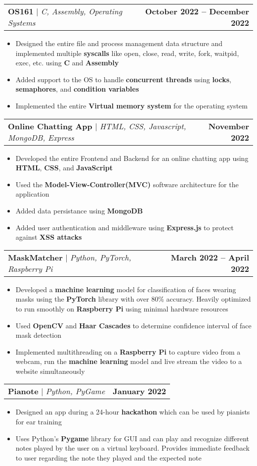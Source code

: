 \documentclass[letterpaper,11pt]{article}
\makeatletter
\newcommand{\resumeItem}[1]{
  \item\small{
    {#1 \vspace{-2pt}}
  }
}
\newcommand{\resumeProjectHeading}[2]{
    \item
    \begin{tabular*}{0.97\textwidth}{l@{\extracolsep{\fill}}r}
      \small#1 & \textbf{#2} \\
    \end{tabular*}\vspace{-5pt}
}
\newcommand{\resumeItemListStart}{\begin{itemize}}
\newcommand{\resumeItemListEnd}{\end{itemize}\vspace{-5pt}}
\makeatother
\begin{document}
          
      \resumeProjectHeading
          {\textbf{OS161} $|$ \emph{C, Assembly, Operating Systems}}{October 2022 -- December 2022}
          \resumeItemListStart
            \resumeItem{Designed the entire file and process management data structure and implemented multiple \textbf{syscalls} like open, close, read, write, fork, waitpid, exec, etc. using \textbf{C} and \textbf{Assembly}}
            \resumeItem{Added support to the OS to handle \textbf{concurrent threads} using \textbf{locks}, \textbf{semaphores}, and \textbf{condition variables}}
            \resumeItem{Implemented the entire \textbf{Virtual memory system} for the operating system}
          \resumeItemListEnd
    

        \resumeProjectHeading
            {\textbf{Online Chatting App} $|$ \emph{HTML, CSS, Javascript, MongoDB, Express}}{November 2022}
            \resumeItemListStart
                \resumeItem{Developed the entire Frontend and Backend for an online chatting app using \textbf{HTML}, \textbf{CSS}, and \textbf{JavaScript}}
                \resumeItem{Used the \textbf{Model-View-Controller(MVC)} software architecture for the application}
                \resumeItem{Added data persistance using \textbf{MongoDB}}
                \resumeItem{Added user authentication and middleware using \textbf{Express.js} to protect against \textbf{XSS attacks}}
            \resumeItemListEnd

        \resumeProjectHeading
            {\textbf{MaskMatcher} $|$ \emph{Python, PyTorch, Raspberry Pi}}{March 2022 -- April 2022}
            \resumeItemListStart
                \resumeItem{Developed a \textbf{machine learning} model for classification of faces wearing masks using the \textbf{PyTorch} library with over 80\% accuracy. Heavily optimized to run smoothly on \textbf{Raspberry Pi} using minimal hardware resources}
                \resumeItem{Used \textbf{OpenCV} and \textbf{Haar Cascades} to determine confidence interval of face mask detection}
                \resumeItem{Implemented multithreading on a \textbf{Raspberry Pi} to capture video from a webcam, run the \textbf{machine learning} model and live stream the video to a website simultaneously}
            \resumeItemListEnd
            
        \pagebreak

        \resumeProjectHeading
            {\textbf{Pianote} $|$ \emph{Python, PyGame}}{January 2022}
            \resumeItemListStart
                \resumeItem{Designed an app during a 24-hour \textbf{hackathon} which can be used by pianists for ear training }
                \resumeItem{Uses Python’s \textbf{Pygame} library for GUI and can play and recognize different notes played by the user on a virtual keyboard. Provides immediate feedback to user regarding the note they played and the expected note}
            \resumeItemListEnd
\end{document}
